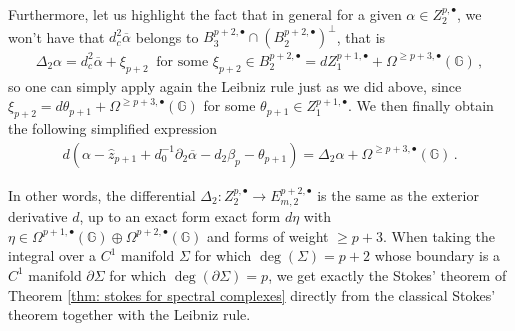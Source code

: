 \documentclass[dvipsnames]{amsart}
\theoremstyle{definition}
\theoremstyle{definition}
\numberwithin{equation}{section}
\newcommand{\G}{\mathbb{G}}
\begin{document}
Furthermore, let us highlight the fact that in general for a given $\alpha\in Z_2^{p,\bullet}$, we won't have that $d_c^2\overline{\alpha}$ belongs to $B_3^{p+2,\bullet}\cap (B_2^{p+2,\bullet})^\perp$, that is
\begin{align*}
    \Delta_2\alpha=d_c^2\overline{\alpha}+\xi_{p+2}\ \text{ for some }\xi_{p+2}\in B_2^{p+2,\bullet}=dZ_1^{p+1,\bullet}+\Omega^{\ge p+3,\bullet}(\G)\,,
\end{align*}
so one can simply apply again the Leibniz rule just as we did above, since $\xi_{p+2}=d\theta_{p+1}+\Omega^{\ge p+3,\bullet}(\G)$ for some $\theta_{p+1}\in Z_1^{p+1,\bullet}$. We then finally obtain the following simplified expression
\begin{align*}
     d(\alpha-\hat{z}_{p+1}+d_0^{-1}\partial_2\overline{\alpha}-d_2\beta_p-\theta_{p+1})=\Delta_2\alpha+\Omega^{\ge p+3,\bullet}(\G)\,.
\end{align*}

In other words, the differential $\Delta_2\colon Z_2^{p,\bullet}\longrightarrow E_{m,2}^{p+2,\bullet}$ is the same as the exterior derivative $d$, up to an exact form exact form $d\eta$ with $\eta\in\Omega^{p+1,\bullet}(\G)\oplus\Omega^{p+2,\bullet}(\G)$ and forms of weight $\ge p+3$. When taking the integral over a $C^1$ manifold $\Sigma$ for which $\operatorname{deg}(\Sigma)=p+2$ whose boundary is a $C^1$ manifold $\partial\Sigma$ for which $\operatorname{deg}(\partial\Sigma)=p$, we get exactly the Stokes' theorem of Theorem \ref{thm: stokes for spectral complexes} directly from the classical Stokes' theorem together with the Leibniz rule.
\end{document}

